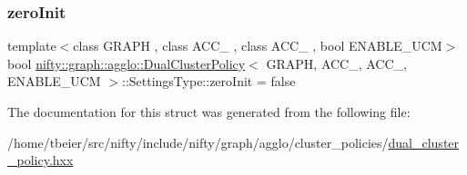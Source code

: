 \subsubsection{\texorpdfstring{zero\+Init}{zeroInit}}
{\footnotesize\ttfamily template$<$class G\+R\+A\+PH , class A\+C\+C\+\_ , class A\+C\+C\+\_ , bool E\+N\+A\+B\+L\+E\+\_\+\+U\+CM$>$ \\
bool \hyperlink{classnifty_1_1graph_1_1agglo_1_1DualClusterPolicy}{nifty\+::graph\+::agglo\+::\+Dual\+Cluster\+Policy}$<$ G\+R\+A\+PH, A\+C\+C\+\_, A\+C\+C\+\_, E\+N\+A\+B\+L\+E\+\_\+\+U\+CM $>$\+::Settings\+Type\+::zero\+Init = false}



The documentation for this struct was generated from the following file\+:\begin{DoxyCompactItemize}
\item 
/home/tbeier/src/nifty/include/nifty/graph/agglo/cluster\+\_\+policies/\hyperlink{dual__cluster__policy_8hxx}{dual\+\_\+cluster\+\_\+policy.\+hxx}\end{DoxyCompactItemize}
